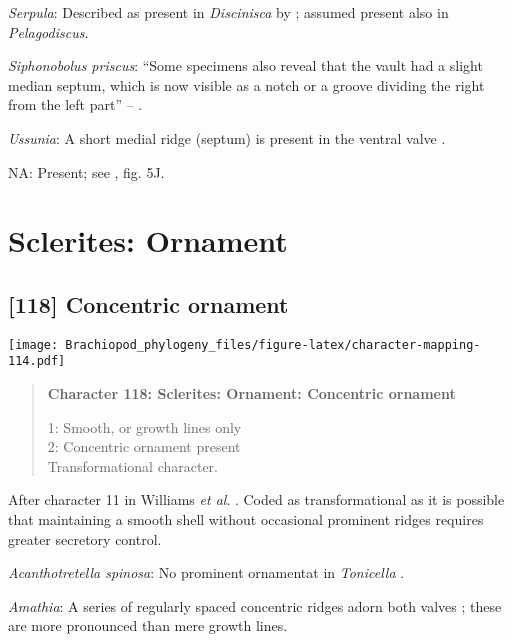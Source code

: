 \documentclass[openany]{book}
\theoremstyle{definition}
\theoremstyle{definition}
\theoremstyle{definition}
\theoremstyle{remark}
\begin{document}
\hypertarget{Serpula-coding-117}{}
\emph{Serpula}: Described as present in \emph{Discinisca} by
\citet{Chen2007Reinterpretationof}; assumed present also in
\emph{Pelagodiscus}.

\hypertarget{Siphonobolus_priscus-coding-117}{}
\emph{Siphonobolus priscus}: ``Some specimens also reveal that the vault
had a slight median septum, which is now visible as a notch or a groove
dividing the right from the left part'' --
\citet{Balthasar2008iMummpikia}.

\hypertarget{Ussunia-coding-117}{}
\emph{Ussunia}: A short medial ridge (septum) is present in the ventral
valve \citep{Topper2013Reappraisalof}.

\hypertarget{NA-coding-117}{}
NA: Present; see \citet{Popov2009Earlyontogeny}, fig. 5J.

\section{Sclerites: Ornament}\label{sclerites-ornament}

\subsection*{{[}118{]} Concentric ornament}\label{concentric-ornament}

\texttt{[image: Brachiopod\_phylogeny\_files/figure-latex/character-mapping-114.pdf]}

\begin{quote}
\textbf{Character 118: Sclerites: Ornament: Concentric ornament}

1: Smooth, or growth lines only\\
2: Concentric ornament present\\
Transformational character.
\end{quote}

After character 11 in Williams \emph{et al}.
\citeyearpar{Williams1998Thediversity}. Coded as transformational as it
is possible that maintaining a smooth shell without occasional prominent
ridges requires greater secretory control.

\hypertarget{Acanthotretella_spinosa-coding-118}{}
\emph{Acanthotretella spinosa}: No prominent ornamentat in
\emph{Tonicella} \citep{Connors2012}.

\hypertarget{Amathia-coding-118}{}
\emph{Amathia}: A series of regularly spaced concentric ridges adorn
both valves \citep{Moysiuk2017Hyolithsare}; these are more pronounced
than mere growth lines.
\end{document}
